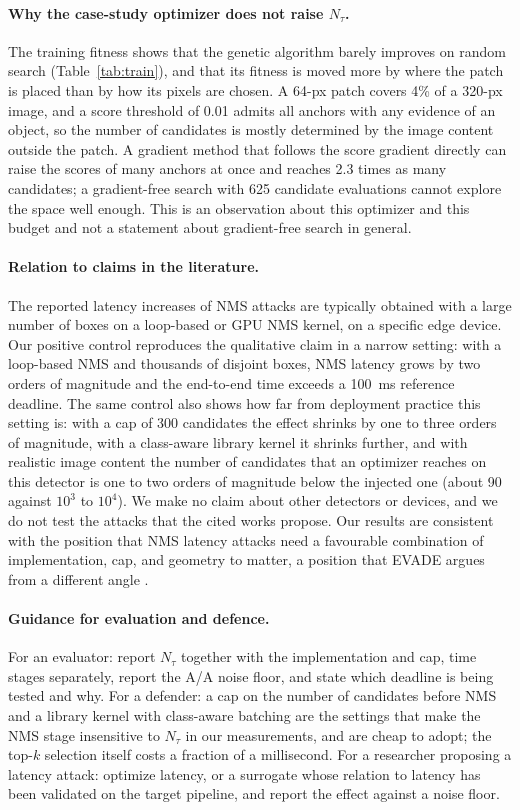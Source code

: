 \documentclass[a4paper,fleqn]{cas-dc}
\newcommand{\Ntau}{N_{\tau}}
\begin{document}
\paragraph{Why the case-study optimizer does not raise $\Ntau$.}
The training fitness shows that the genetic algorithm barely improves on random search (Table~\ref{tab:train}), and that its fitness is moved more by where the patch is placed than by how its pixels are chosen. A 64-px patch covers 4\% of a 320-px image, and a score threshold of 0.01 admits all anchors with any evidence of an object, so the number of candidates is mostly determined by the image content outside the patch. A gradient method that follows the score gradient directly can raise the scores of many anchors at once and reaches 2.3 times as many candidates; a gradient-free search with 625 candidate evaluations cannot explore the space well enough. This is an observation about this optimizer and this budget and not a statement about gradient-free search in general.

\paragraph{Relation to claims in the literature.}
The reported latency increases of NMS attacks are typically obtained with a large number of boxes on a loop-based or GPU NMS kernel, on a specific edge device. Our positive control reproduces the qualitative claim in a narrow setting: with a loop-based NMS and thousands of disjoint boxes, NMS latency grows by two orders of magnitude and the end-to-end time exceeds a 100~ms reference deadline. The same control also shows how far from deployment practice this setting is: with a cap of 300 candidates the effect shrinks by one to three orders of magnitude, with a class-aware library kernel it shrinks further, and with realistic image content the number of candidates that an optimizer reaches on this detector is one to two orders of magnitude below the injected one (about 90 against $10^3$ to $10^4$). We make no claim about other detectors or devices, and we do not test the attacks that the cited works propose. Our results are consistent with the position that NMS latency attacks need a favourable combination of implementation, cap, and geometry to matter, a position that EVADE argues from a different angle \cite{evade2025}.

\paragraph{Guidance for evaluation and defence.}
For an evaluator: report $\Ntau$ together with the implementation and cap, time stages separately, report the A/A noise floor, and state which deadline is being tested and why. For a defender: a cap on the number of candidates before NMS and a library kernel with class-aware batching are the settings that make the NMS stage insensitive to $\Ntau$ in our measurements, and are cheap to adopt; the top-$k$ selection itself costs a fraction of a millisecond. For a researcher proposing a latency attack: optimize latency, or a surrogate whose relation to latency has been validated on the target pipeline, and report the effect against a noise floor.
\end{document}
